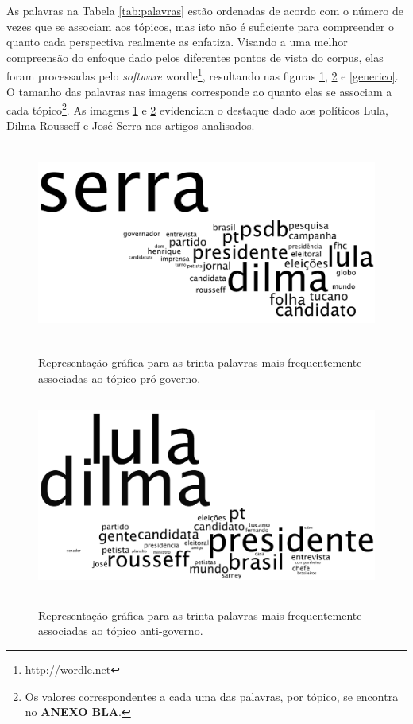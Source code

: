 As palavras na Tabela \ref{tab:palavras} estão ordenadas de acordo com o número de vezes que se associam aos tópicos, mas isto não é suficiente para compreender o quanto cada perspectiva realmente as enfatiza. Visando a uma melhor compreensão do enfoque dado pelos diferentes pontos de vista do corpus, elas foram processadas pelo \emph{software} wordle\footnote{http://wordle.net}, resultando nas figuras \ref{situacao}, \ref{oposicao} e \ref{generico}. O tamanho das palavras nas imagens corresponde ao quanto elas se associam a cada tópico\footnote{Os valores correspondentes a cada uma das palavras, por tópico, se encontra no \textbf{ANEXO BLA}.}. As imagens \ref{situacao} e \ref{oposicao} evidenciam o destaque dado aos políticos Lula, Dilma Rousseff e José Serra nos artigos analisados. 


\begin{figure}[h!]
  \centering %
  \includegraphics[width=12.5cm, height=6.5cm]{situacao.png}\\
  \caption{Representação gráfica para as trinta palavras mais frequentemente associadas ao tópico pró-governo.}
  \label{situacao}
\end{figure}

\begin{figure}[h!]
  \centering %
  \includegraphics[width=12.5cm, height=6.5cm]{oposicao.png}\\
  \caption{Representação gráfica para as trinta palavras mais frequentemente associadas ao tópico anti-governo.}
  \label{oposicao}
\end{figure}

